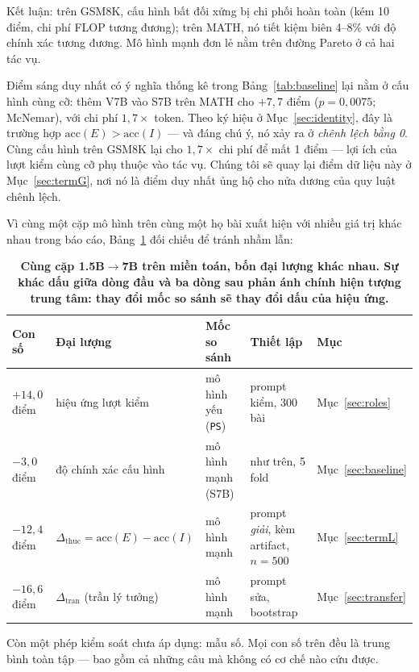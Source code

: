 \documentclass[12pt,a4paper]{article}
\newcommand{\dceil}{\Delta_{\mathrm{tran}}}
\newcommand{\dhonest}{\Delta_{\mathrm{thuc}}}
\newcommand{\acc}{\mathrm{acc}}
\begin{document}
Kết luận: trên GSM8K, cấu hình bất đối xứng bị chi phối hoàn toàn (kém 10 điểm, chi phí FLOP tương đương); trên MATH, nó tiết kiệm biên 4--8\% với độ chính xác tương đương. Mô hình mạnh đơn lẻ nằm trên đường Pareto ở cả hai tác vụ.

Điểm sáng duy nhất có ý nghĩa thống kê trong Bảng~\ref{tab:baseline} lại nằm ở cấu hình cùng cỡ: thêm V7B vào S7B trên MATH cho \(+7{,}7\) điểm (\(p=0{,}0075\); McNemar), với chi phí \(1{,}7\times\) token. Theo ký hiệu ở Mục~\ref{sec:identity}, đây là trường hợp \(\acc(E) > \acc(I)\) --- và đáng chú ý, nó xảy ra ở \textit{chênh lệch bằng 0}. Cùng cấu hình trên GSM8K lại cho \(1{,}7\times\) chi phí để mất 1 điểm --- lợi ích của lượt kiểm cùng cỡ phụ thuộc vào tác vụ. Chúng tôi sẽ quay lại điểm dữ liệu này ở Mục~\ref{sec:termG}, nơi nó là điểm duy nhất ủng hộ cho nửa dương của quy luật chênh lệch.

Vì cùng một cặp mô hình trên cùng một họ bài xuất hiện với nhiều giá trị khác nhau trong báo cáo, Bảng~\ref{tab:doichieu} đối chiếu để tránh nhầm lẫn:

\begin{table}[h]\centering\small
\begin{tabular}{@{}l l l l l@{}}
\toprule
Con số & Đại lượng & Mốc so sánh & Thiết lập & Mục\\
\midrule
\(+14{,}0\) điểm & hiệu ứng lượt kiểm & mô hình yếu (\texttt{PS}) & prompt kiểm, 300 bài & Mục~\ref{sec:roles}\\
\(-3{,}0\) điểm & độ chính xác cấu hình & mô hình mạnh (S7B) & như trên, 5 fold & Mục~\ref{sec:baseline}\\
\(-12{,}4\) điểm & \(\dhonest = \acc(E)-\acc(I)\) & mô hình mạnh & prompt \textit{giải}, kèm artifact, \(n=500\) & Mục~\ref{sec:termL}\\
\(-16{,}6\) điểm & \(\dceil\) (trần lý tưởng) & mô hình mạnh & prompt sửa, bootstrap & Mục~\ref{sec:transfer}\\
\bottomrule
\end{tabular}
\caption{\textbf{Cùng cặp 1.5B\(\to\)7B trên miền toán, bốn đại lượng khác nhau. Sự khác dấu giữa dòng đầu và ba dòng sau phản ánh chính hiện tượng trung tâm: thay đổi mốc so sánh sẽ thay đổi dấu của hiệu ứng.}}
\label{tab:doichieu}
\end{table}

Còn một phép kiểm soát chưa áp dụng: mẫu số. Mọi con số trên đều là trung bình toàn tập --- bao gồm cả những câu mà không có cơ chế nào cứu được.

\end{document}
